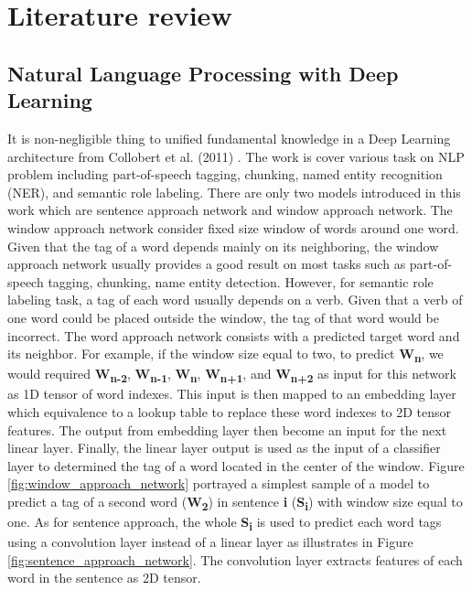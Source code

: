 \section{Literature review}

\subsection{Natural Language Processing with Deep Learning}
It is non-negligible thing to unified fundamental knowledge in a Deep Learning architecture from Collobert et al. (2011) \cite{DBLP:journals/corr/abs-1103-0398}.
The work is cover various task on NLP problem including part-of-speech tagging, chunking, named entity recognition (NER), and semantic role labeling.
There are only two models introduced in this work which are sentence approach network and window approach network.
The window approach network consider fixed size window of words around one word.
Given that the tag of a word depends mainly on its neighboring, the window approach network usually provides a good result on most tasks such as part-of-speech tagging, chunking, name entity detection.
However, for semantic role labeling task, a tag of each word usually depends on a verb.
Given that a verb of one word could be placed outside the window, the tag of that word would be incorrect.
The word approach network consists with a predicted target word and its neighbor.
For example, if the window size equal to two, to predict \textbf{W\textsubscript{n}}, we would required \textbf{W\textsubscript{n-2}}, \textbf{W\textsubscript{n-1}}, \textbf{W\textsubscript{n}}, \textbf{W\textsubscript{n+1}}, and \textbf{W\textsubscript{n+2}} as input for this network as 1D tensor of word indexes.
This input is then mapped to an embedding layer which equivalence to a lookup table to replace these word indexes to 2D tensor features.
The output from embedding layer then become an input for the next linear layer.
Finally, the linear layer output is used as the input of a classifier layer to determined the tag of a word located in the center of the window.
Figure \ref{fig:window_approach_network} portrayed a simplest sample of a model to predict a tag of a second word (\textbf{W\textsubscript{2}}) in sentence \textbf{i} (\textbf{S\textsubscript{i}}) with window size equal to one.
As for sentence approach, the whole \textbf{S\textsubscript{i}} is used to predict each word tags using a convolution layer instead of a linear layer as illustrates in Figure \ref{fig:sentence_approach_network}. The convolution layer extracts features of each word in the sentence as 2D tensor. 
